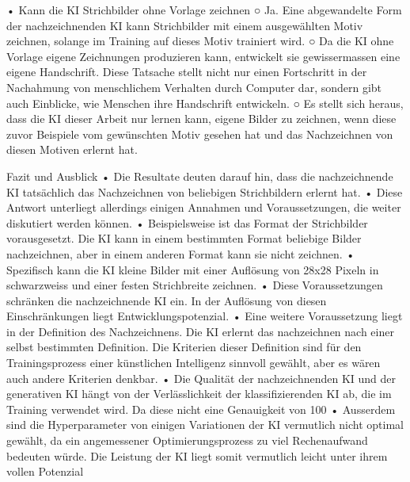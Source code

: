 	• Kann die KI Strichbilder ohne Vorlage zeichnen
		○ Ja. Eine abgewandelte Form der nachzeichnenden KI kann Strichbilder mit einem ausgewählten Motiv zeichnen, solange im Training auf dieses Motiv trainiert wird.
		○ Da die KI ohne Vorlage eigene Zeichnungen produzieren kann, entwickelt sie gewissermassen eine eigene Handschrift. Diese Tatsache stellt nicht nur einen Fortschritt in der Nachahmung von menschlichem Verhalten durch Computer dar, sondern gibt auch Einblicke, wie Menschen ihre Handschrift entwickeln. 
		○ Es stellt sich heraus, dass die KI dieser Arbeit nur lernen kann, eigene Bilder zu zeichnen, wenn diese zuvor Beispiele vom gewünschten Motiv gesehen hat und das Nachzeichnen von diesen Motiven erlernt hat.












Fazit und Ausblick 
	• Die Resultate deuten darauf hin, dass die nachzeichnende KI tatsächlich das Nachzeichnen von beliebigen Strichbildern erlernt hat. 
	• Diese Antwort unterliegt allerdings einigen Annahmen und Voraussetzungen, die weiter diskutiert werden können.
	• Beispielsweise ist das Format der Strichbilder vorausgesetzt. Die KI kann in einem bestimmten Format beliebige Bilder nachzeichnen, aber in einem anderen Format kann sie nicht zeichnen.
	• Spezifisch kann die KI kleine Bilder mit einer Auflösung von 28x28 Pixeln in schwarzweiss und einer festen Strichbreite zeichnen. 
	• Diese Voraussetzungen schränken die nachzeichnende KI ein. In der Auflösung von diesen Einschränkungen liegt Entwicklungspotenzial.
	• Eine weitere Voraussetzung liegt in der Definition des Nachzeichnens. Die KI erlernt das nachzeichnen nach einer selbst bestimmten Definition. Die Kriterien dieser Definition sind für den Trainingsprozess einer künstlichen Intelligenz sinnvoll gewählt, aber es wären auch andere Kriterien denkbar.
	• Die Qualität der nachzeichnenden KI und der generativen KI hängt von der Verlässlichkeit der klassifizierenden KI ab, die im Training verwendet wird. Da diese nicht eine Genauigkeit von 100%
	• Ausserdem sind die Hyperparameter von einigen Variationen der KI vermutlich nicht optimal gewählt, da ein angemessener Optimierungsprozess zu viel Rechenaufwand bedeuten würde. Die Leistung der KI liegt somit vermutlich leicht unter ihrem vollen Potenzial
	

